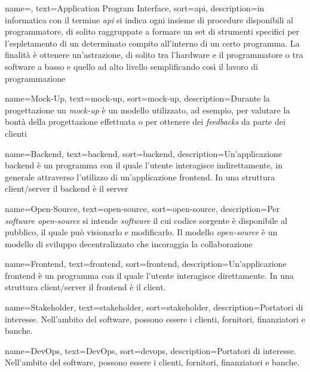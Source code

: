 {
    name=,
    text=Application Program Interface,
    sort=api,
    description={in informatica con il termine \emph{\acrfull{api}} si indica ogni insieme di procedure disponibili al programmatore, di solito raggruppate a formare un set di strumenti specifici per l'espletamento di un determinato compito all'interno di un certo programma. La finalità è ottenere un'astrazione, di solito tra l'hardware e il programmatore o tra software a basso e quello ad alto livello semplificando così il lavoro di programmazione}
}


{
    name=Mock-Up,
    text=mock-up,
    sort=mock-up,
    description={Durante la progettazione un \emph{mock-up} è un modello utilizzato, ad esempio, per valutare la bontà della progettazione effettuata o per ottenere dei \emph{feedbacks} da parte dei clienti}
}

{
    name=Backend,
    text=backend,
    sort=backend,
    description={Un'applicazione backend è un programma con il quale l'utente interagisce indirettamente, in generale attraverso l'utilizzo di un'applicazione \gls{frontend}. In una struttura client/server il backend è il server}
}

{
    name=Open-Source,
    text=open-source,
    sort=open-source,
    description={Per \emph{software open-source} si intende \emph{software} il cui codice sorgente è disponibile al pubblico, il quale può visionarlo e modificarlo. Il modello \emph{open-source} è un modello di sviluppo decentralizzato che incoraggia la collaborazione}
}

{
    name=Frontend,
    text=frontend,
    sort=frontend,
    description={Un'applicazione frontend è un programma con il quale l'utente interagisce direttamente. In una struttura client/server il frontend è il client.}
}

{
    name=Stakeholder,
    text=stakeholder,
    sort=stakeholder,
    description={Portatori di interesse. Nell'ambito del software, possono essere i clienti, fornitori, finanziatori e banche.}
}

{
    name=DevOps,
    text=DevOps,
    sort=devops,
    description={Portatori di interesse. Nell'ambito del software, possono essere i clienti, fornitori, finanziatori e banche.}
}
